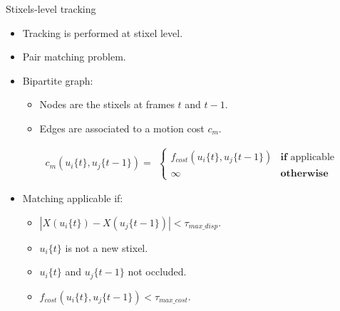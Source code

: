 \begin{frame}{Stixels-level tracking}
  \begin{itemize}
    \item Tracking is performed at stixel level.
    \item Pair matching problem.
    \item Bipartite graph:
    \begin{itemize}
      \item Nodes are the stixels at frames $t$ and $t-1$.
      \item Edges are associated to a motion cost $c_m$.
  \end{itemize}
  \vskip 0.2cm
  \begin{equation}
  \nonumber
    c_m(u_i\{t\}, u_j\{t - 1\}) = 
    \begin{align*}
      \begin{cases}
      f_{cost}(u_i\{t\}, u_j\{t - 1\}) & \textbf{if} \text{ applicable} \\
      \infty & \textbf{otherwise}
      \end{cases}
    \end{align*}
  \end{equation}
  \item Matching applicable if:
  \begin{itemize}
    \item $|X(u_i\{t\}) - X(u_j\{t - 1\})| < \tau_{max\_disp}$.
    \item $u_i\{t\}$ is not a new stixel.
    \item $u_i\{t\}$ and $u_j\{t - 1\}$ not occluded.
    \item $f_{cost}(u_i\{t\}, u_j\{t - 1\}) < \tau_{max\_cost}$.
  \end{itemize}
    
  \end{itemize}
  
\end{frame}


